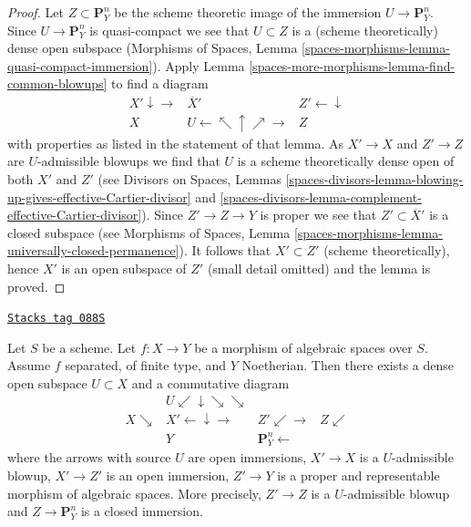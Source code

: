 \begin{proof}
Let $Z \subset \mathbf{P}^n_Y$ be the scheme theoretic image of
the immersion $U \to \mathbf{P}^n_Y$. Since $U \to \mathbf{P}^n_Y$
is quasi-compact we see that $U \subset Z$ is a
(scheme theoretically) dense open subspace
(Morphisms of Spaces, Lemma
\ref{spaces-morphisms-lemma-quasi-compact-immersion}).
Apply Lemma \ref{spaces-more-morphisms-lemma-find-common-blowups} to find a diagram
$$
\begin{array}{ccc}X' \downarrow\longrightarrow & \overline{X}' & Z' \longleftarrow\downarrow \\ X & U \longleftarrow\nwarrow\uparrow\nearrow\longrightarrow & Z\end{array}
$$
with properties as listed in the statement of that lemma.
As $X' \to X$ and $Z' \to Z$ are $U$-admissible blowups
we find that $U$ is a scheme theoretically dense open of
both $X'$ and $Z'$ (see Divisors on Spaces, Lemmas
\ref{spaces-divisors-lemma-blowing-up-gives-effective-Cartier-divisor} and
\ref{spaces-divisors-lemma-complement-effective-Cartier-divisor}).
Since $Z' \to Z \to Y$ is proper we see that $Z' \subset \overline{X}'$
is a closed subspace (see Morphisms of Spaces, Lemma
\ref{spaces-morphisms-lemma-universally-closed-permanence}).
It follows that $X' \subset Z'$ (scheme theoretically), hence $X'$
is an open subspace of $Z'$ (small detail omitted) and the lemma is proved.
\end{proof}

\begin{lemma}
\label{spaces-more-morphisms-lemma-chow-noetherian}
\href{https://stacks.math.columbia.edu/tag/088S}{\texttt{Stacks tag 088S}}

Let $S$ be a scheme. Let $f : X \to Y$ be a morphism of algebraic spaces
over $S$. Assume $f$ separated, of finite type, and $Y$ Noetherian.
Then there exists a dense open subspace $U \subset X$ and
a commutative diagram
$$
\begin{array}{cccc} & U \swarrow\downarrow\searrow\searrow &  &  \\ X \searrow & X' \longleftarrow\downarrow\longrightarrow & Z' \swarrow\longrightarrow & Z \swarrow \\  & Y & \mathbf{P}^n_Y \longleftarrow & \end{array}
$$
where
the arrows with source $U$ are open immersions,
$X' \to X$ is a $U$-admissible blowup,
$X' \to Z'$ is an open immersion,
$Z' \to Y$ is a proper and representable morphism of algebraic spaces.
More precisely, $Z' \to Z$ is a $U$-admissible blowup
and $Z \to \mathbf{P}^n_Y$ is a closed immersion.
\end{lemma}

